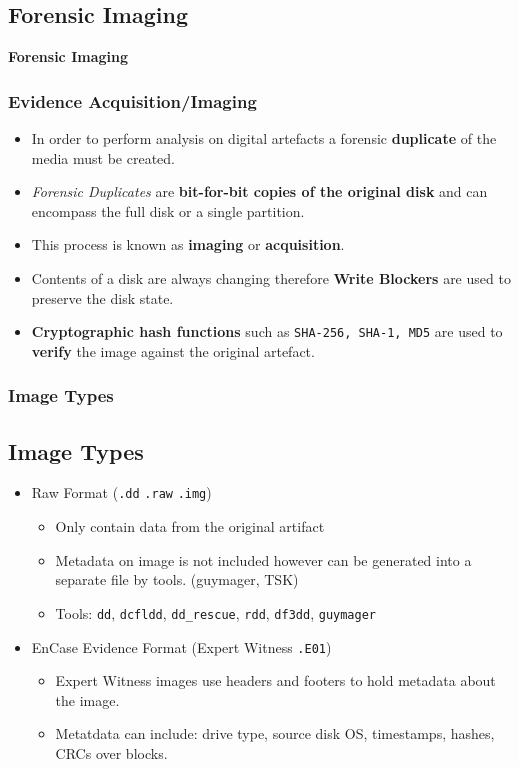 \documentclass{beamer}
\begin{document}
\begin{frame} %
	\section{Forensic Imaging}
	\begin{center}
		\Huge\textbf{Forensic Imaging}
	\end{center}
\end{frame}

\begin{frame}
	\frametitle{Evidence Acquisition/Imaging}
	\begin{itemize}
		\item In order to perform analysis on digital artefacts a forensic \textbf{duplicate} of the media must be created.
		\item \textit{Forensic Duplicates} are \textbf{bit-for-bit copies of the original disk} and can encompass the full disk or a single partition. 
		\item This process is known as \textbf{imaging} or \textbf{acquisition}.
		\item Contents of a disk are always changing therefore \textbf{Write Blockers} are used to preserve the disk state.
		\item \textbf{Cryptographic hash functions} such as \texttt{SHA-256, SHA-1, MD5} are used to \textbf{verify} the image against the original artefact.
	\end{itemize}
\end{frame}

\begin{frame}
	\frametitle{Image Types}
	\subsection*{Image Types}
	\begin{itemize}
		\item Raw Format (\texttt{.dd} \texttt{.raw} \texttt{.img})
		\begin{itemize}
			\item Only contain data from the original artifact
			\item Metadata on image is not included however can be generated into a separate file by tools. (guymager, TSK)
			\item Tools: \texttt{dd}, \texttt{dcfldd}, \texttt{dd\_rescue}, \texttt{rdd}, \texttt{df3dd}, \texttt{guymager}
		\end{itemize}
		\item EnCase Evidence Format (Expert Witness \texttt{.E01})
		\begin{itemize}
			\item Expert Witness images use headers and footers to hold metadata about the image.
			\item Metatdata can include: drive type, source disk OS, timestamps, hashes, CRCs over blocks.
		\end{itemize}
	\end{itemize}
\end{frame}
\end{document}
